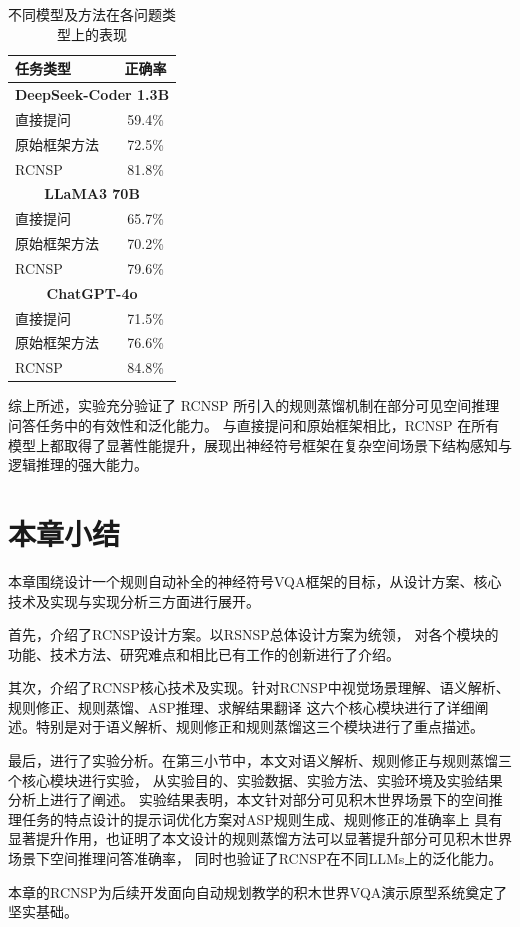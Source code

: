 \begin{table}[h]
    \centering
    \begin{tabular}{lc}
        \toprule
        \textbf{任务类型} & \textbf{正确率} \\
        \midrule
        \multicolumn{2}{c}{\textbf{DeepSeek-Coder 1.3B}} \\
        直接提问 & 59.4\% \\
        原始框架方法 & 72.5\% \\
        RCNSP & 81.8\% \\
        \midrule
        \multicolumn{2}{c}{\textbf{LLaMA3 70B}} \\
        直接提问 & 65.7\% \\
        原始框架方法 & 70.2\% \\
        RCNSP & 79.6\% \\
        \midrule
        \multicolumn{2}{c}{\textbf{ChatGPT-4o}} \\
        直接提问 & 71.5\% \\
        原始框架方法 & 76.6\% \\
        RCNSP & 84.8\% \\
        \bottomrule
    \end{tabular}
    \caption{不同模型及方法在各问题类型上的表现}
    \label{tab:overall_comparison}
\end{table}

综上所述，实验充分验证了 RCNSP 所引入的规则蒸馏机制在部分可见空间推理问答任务中的有效性和泛化能力。
与直接提问和原始框架相比，RCNSP 在所有模型上都取得了显著性能提升，展现出神经符号框架在复杂空间场景下结构感知与逻辑推理的强大能力。
\section{本章小结}
本章围绕设计一个规则自动补全的神经符号VQA框架的目标，从设计方案、核心技术及实现与实现分析三方面进行展开。

首先，介绍了RCNSP设计方案。以RSNSP总体设计方案为统领，
对各个模块的功能、技术方法、研究难点和相比已有工作的创新进行了介绍。

其次，介绍了RCNSP核心技术及实现。针对RCNSP中视觉场景理解、语义解析、规则修正、规则蒸馏、ASP推理、求解结果翻译
这六个核心模块进行了详细阐述。特别是对于语义解析、规则修正和规则蒸馏这三个模块进行了重点描述。

最后，进行了实验分析。在第三小节中，本文对语义解析、规则修正与规则蒸馏三个核心模块进行实验，
从实验目的、实验数据、实验方法、实验环境及实验结果分析上进行了阐述。
实验结果表明，本文针对部分可见积木世界场景下的空间推理任务的特点设计的提示词优化方案对ASP规则生成、规则修正的准确率上
具有显著提升作用，也证明了本文设计的规则蒸馏方法可以显著提升部分可见积木世界场景下空间推理问答准确率，
同时也验证了RCNSP在不同LLMs上的泛化能力。

本章的RCNSP为后续开发面向自动规划教学的积木世界VQA演示原型系统奠定了坚实基础。